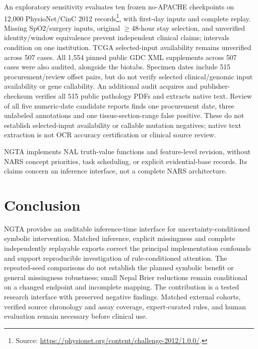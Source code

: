\documentclass{article}
\begin{document}
An exploratory sensitivity evaluates ten frozen no-APACHE checkpoints on 12,000 PhysioNet/CinC 2012 records\footnote{Source: \url{https://physionet.org/content/challenge-2012/1.0.0/}.}, with first-day inputs and complete replay. Missing SpO2/surgery inputs, original $\geq48$-hour stay selection, and unverified identity/window equivalence prevent independent clinical claims; intervals condition on one institution. TCGA selected-input availability remains unverified across 507 cases. All 1,554 pinned public GDC XML supplements across 507 cases were also audited, alongside the biotabs. Specimen dates include 515 procurement/review offset pairs, but do not verify selected clinical/genomic input availability or gene callability. An additional audit acquires and publisher-checksum verifies all 515 public pathology PDFs and extracts native text. Review of all five numeric-date candidate reports finds one procurement date, three unlabeled annotations and one tissue-section-range false positive. These do not establish selected-input availability or callable mutation negatives; native text extraction is not OCR accuracy certification or clinical source review.

NGTA implements NAL truth-value functions and feature-level revision, without NARS concept priorities, task scheduling, or explicit evidential-base records. Its claims concern an inference interface, not a complete NARS architecture.

\section{Conclusion}
\label{sec:conclusion}

NGTA provides an auditable inference-time interface for uncertainty-conditioned symbolic intervention. Matched inference, explicit missingness and complete independently replayable exports correct the principal implementation confounds and support reproducible investigation of rule-conditioned attention. The repeated-seed comparisons do not establish the planned symbolic benefit or general missingness robustness; small Nepal Brier reductions remain conditional on a changed endpoint and incomplete mapping. The contribution is a tested research interface with preserved negative findings. Matched external cohorts, verified source chronology and assay coverage, expert-curated rules, and human evaluation remain necessary before clinical use.
\end{document}
